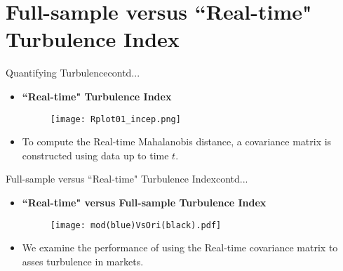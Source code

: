 \documentclass{beamer}
\newcommand*{\LargerCdot}{\raisebox{-0.25ex}{\scalebox{2.3}{$\cdot$}}}
\begin{document}
\section{Full-sample versus ``Real-time" Turbulence Index}
\begin{frame}{Quantifying Turbulence}{contd...}
	\vspace*{-0.06 in}
  	\begin{itemize}
		\item{\textbf{``Real-time" Turbulence Index}}
		\vspace*{-0.58cm}
		\begin{figure}
			\scalebox{0.8}
			{\hspace*{-0.3in}\texttt{[image: Rplot01\_incep.png]} }
		\end{figure}
		\vspace*{-0.5cm}
		\item{To compute the Real-time Mahalanobis distance, a covariance matrix is constructed using data up to time $t$.}
	\end{itemize}
\end{frame}

\begin{frame}{Full-sample versus ``Real-time" Turbulence Index}{contd...}
 	\begin{itemize}
	\vspace*{-0.1 in}
		\item{\textbf{``Real-time" versus Full-sample Turbulence Index}}
		\vspace*{-0.25 in}
		\begin{figure}
			\scalebox{0.65}
			{\hspace*{-0.5in}\texttt{[image: mod(blue)VsOri(black).pdf]} }
		\end{figure}
	\vspace*{-0.3cm}
		\item{We examine the performance of using the Real-time covariance matrix to asses turbulence in markets.}
	\end{itemize}
\end{frame}
\end{document}
